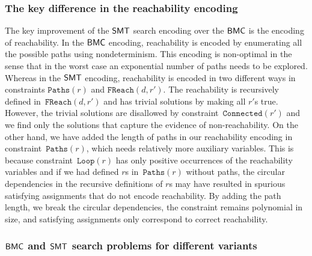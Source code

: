 
\subsubsection{The key difference in the reachability encoding}
The key improvement of the $\mathsf{SMT}$ search encoding over the $\mathsf{BMC}$ is the
encoding of reachability.
%
In the $\mathsf{BMC}$ encoding, reachability is encoded by enumerating all the possible paths using nondeterminism.
%
This encoding is non-optimal in the sense that in the worst case an exponential number of paths needs to be explored.
%
Whereas in the $\mathsf{SMT}$ encoding, reachability is encoded in two different
ways in constraints $\texttt{Paths}(r)$ and $\texttt{FReach}(d,r')$.
%
The reachability is recursively defined in~$\texttt{FReach}(d,r')$ and has
trivial solutions by making all $r'$s true.
%
However, the trivial solutions are disallowed by constraint~$\texttt{Connected}(r')$ and we find
only the solutions that capture the evidence of non-reachability.
%
On the other hand, we have added the length of paths in our reachability encoding in constraint~$\texttt{Paths}(r)$, which needs relatively more auxiliary variables.
%
This is because constraint~$\texttt{Loop}(r)$ has only positive
occurrences of the reachability variables and if we had defined
$r$s in~$\texttt{Paths}(r)$ without paths,
the circular dependencies in the recursive definitions of $r$s
may have resulted in spurious satisfying assignments that
do not encode reachability.
%
By adding the path length, we break the circular dependencies, the
constraint remains polynomial in size, and satisfying assignments only
correspond to correct reachability.



\subsubsection{$\mathsf{BMC}$ and $\mathsf{SMT}$ search problems for different variants}

